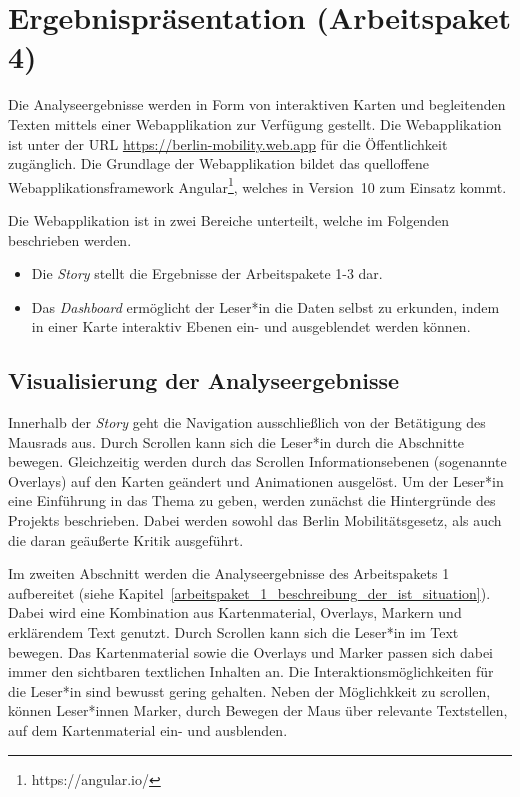 \newpage

\section{Ergebnispräsentation (Arbeitspaket 4)}
\label{ergebnispraesentation}

Die Analyseergebnisse werden in Form von interaktiven Karten und begleitenden Texten mittels einer Webapplikation zur Verfügung gestellt. Die Webapplikation ist unter der URL \url{https://berlin-mobility.web.app} für die Öffentlichkeit zugänglich. Die Grundlage der Webapplikation bildet das quelloffene Webapplikationsframework Angular\footnote{https://angular.io/}, welches in Version~10 zum Einsatz kommt.


Die Webapplikation ist in zwei Bereiche unterteilt, welche im Folgenden beschrieben werden.

\begin{itemize}
    \item Die \emph{Story} stellt die Ergebnisse der Arbeitspakete 1-3 dar.
    \item Das \emph{Dashboard} ermöglicht der Leser*in die Daten selbst zu erkunden, indem in einer Karte interaktiv Ebenen ein- und ausgeblendet werden können.
\end{itemize}

\subsection{Visualisierung der Analyseergebnisse}
\label{visualisierung_der_analyseergebnisse}

Innerhalb der \emph{Story} geht die Navigation ausschließlich von der Betätigung des Mausrads aus. Durch Scrollen kann sich die Leser*in durch die Abschnitte bewegen. Gleichzeitig werden durch das Scrollen Informationsebenen (sogenannte Overlays) auf den Karten geändert und Animationen ausgelöst. Um der Leser*in eine Einführung in das Thema zu geben, werden zunächst die Hintergründe des Projekts beschrieben. Dabei werden sowohl das Berlin Mobilitätsgesetz, als auch die daran geäußerte Kritik ausgeführt.

Im zweiten Abschnitt werden die Analyseergebnisse des Arbeitspakets 1 aufbereitet (siehe Kapitel~\ref{arbeitspaket_1_beschreibung_der_ist_situation}). Dabei wird eine Kombination aus Kartenmaterial, Overlays, Markern und erklärendem Text genutzt. Durch Scrollen kann sich die Leser*in im Text bewegen. Das Kartenmaterial sowie die Overlays und Marker passen sich dabei immer den sichtbaren textlichen Inhalten an. Die Interaktionsmöglichkeiten für die Leser*in sind bewusst gering gehalten. Neben der Möglichkkeit zu scrollen, können Leser*innen Marker, durch Bewegen der Maus über relevante Textstellen, auf dem Kartenmaterial ein- und ausblenden.

